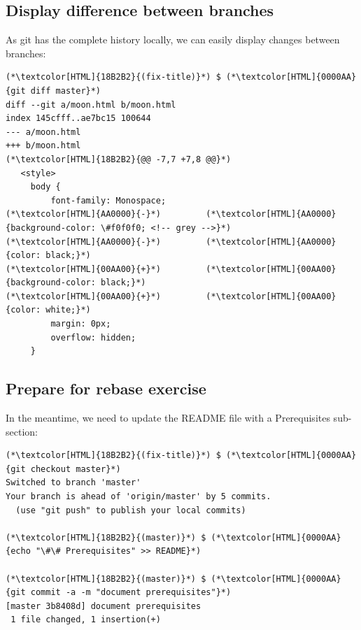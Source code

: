 \subsection{Display difference between branches}
\begin{frame}[fragile]
  \subslidetitle

  As git has the complete history locally, we can easily display changes between branches:

  \begin{lstlisting}
(*\textcolor[HTML]{18B2B2}{(fix-title)}*) $ (*\textcolor[HTML]{0000AA}{git diff master}*)
diff --git a/moon.html b/moon.html
index 145cfff..ae7bc15 100644
--- a/moon.html
+++ b/moon.html
(*\textcolor[HTML]{18B2B2}{@@ -7,7 +7,8 @@}*)
   <style>
     body {
         font-family: Monospace;
(*\textcolor[HTML]{AA0000}{-}*)         (*\textcolor[HTML]{AA0000}{background-color: \#f0f0f0; <!-- grey -->}*)
(*\textcolor[HTML]{AA0000}{-}*)         (*\textcolor[HTML]{AA0000}{color: black;}*)
(*\textcolor[HTML]{00AA00}{+}*)         (*\textcolor[HTML]{00AA00}{background-color: black;}*)
(*\textcolor[HTML]{00AA00}{+}*)         (*\textcolor[HTML]{00AA00}{color: white;}*)
         margin: 0px;
         overflow: hidden;
     }
\end{lstlisting}
\end{frame}

\subsection{Prepare for rebase exercise}
\begin{frame}[fragile]
  \subslidetitle

  In the meantime, we need to update the README file with a Prerequisites sub-section:
  \begin{lstlisting}
(*\textcolor[HTML]{18B2B2}{(fix-title)}*) $ (*\textcolor[HTML]{0000AA}{git checkout master}*)
Switched to branch 'master'
Your branch is ahead of 'origin/master' by 5 commits.
  (use "git push" to publish your local commits)

(*\textcolor[HTML]{18B2B2}{(master)}*) $ (*\textcolor[HTML]{0000AA}{echo "\#\# Prerequisites" >> README}*)

(*\textcolor[HTML]{18B2B2}{(master)}*) $ (*\textcolor[HTML]{0000AA}{git commit -a -m "document prerequisites"}*)
[master 3b8408d] document prerequisites
 1 file changed, 1 insertion(+)
\end{lstlisting}

\end{frame}

